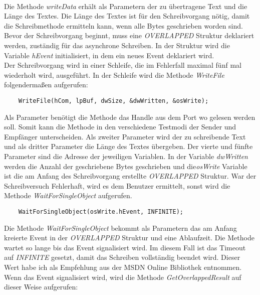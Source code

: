 \paragraph{}
Die Methode \textit{writeData} erhält als Parametern der zu übertragene Text und die Länge des Textes. Die Länge des Textes ist für den Schreibvorgang nötig, damit die Schreibmethode ermitteln kann, wenn alle Bytes geschrieben worden sind. Bevor der Schreibvorgang beginnt, muss eine \textit{OVERLAPPED} Struktur deklariert werden, zuständig für das asynchrone Schreiben. In der Struktur wird die Variable \textit{hEvent} initialisiert, in dem ein neues Event deklariert wird.\\

Der Schreibvorgang wird in einer Schleife, die im Fehlerfall maximal fünf mal wiederholt wird, ausgeführt. In der Schleife wird die Methode \textit{WriteFile} folgendermaßen aufgerufen:
\begin{lstlisting}
	WriteFile(hCom, lpBuf, dwSize, &dwWritten, &osWrite);
\end{lstlisting}

Als Parameter benötigt die Methode das Handle aus dem Port wo gelesen werden soll. Somit kann die Methode in den verschiedene Testmodi der Sender und Empfänger unterscheiden. Als zweiter Parameter wird der zu schreibende Text und als dritter Parameter die Länge des Textes übergeben. Der vierte und fünfte Parameter sind die Adresse der jeweiligen Variablen. In der Variable \textit{dwWritten} werden die Anzahl der geschriebene Bytes geschrieben und die\textit{osWrite} Variable ist die am Anfang des Schreibvorgang erstellte \textit{OVERLAPPED} Struktur. War der Schreibversuch Fehlerhaft, wird es dem Benutzer ermittelt, sonst wird die Methode \textit{WaitForSingleObject} aufgerufen.

\begin{lstlisting}
	WaitForSingleObject(osWrite.hEvent, INFINITE);
\end{lstlisting}

Die Methode \textit{WaitForSingleObject} bekommt als Parametern das am Anfang kreierte Event in der \textit{OVERLAPPED} Struktur und eine Ablaufzeit. Die Methode wartet so lange bis das Event signalisiert wird. Im diesem Fall ist das Timeout auf \textit{INFINITE} gesetzt, damit das Schreiben vollständig beendet wird. Dieser Wert habe ich als Empfehlung aus der MSDN Online Bibliothek\cite{SerialCommunications} entnommen. Wenn das Event signalisiert wird, wird die Methode \textit{GetOverlappedResult} auf dieser Weise aufgerufen:

